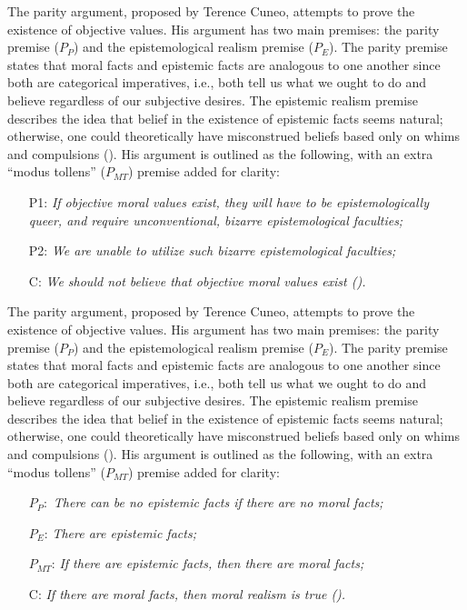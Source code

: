 The parity argument, proposed by Terence Cuneo, attempts to prove the existence of objective values. His argument has two main premises: the parity premise ($P_P$) and the epistemological realism premise ($P_E$). The parity premise states that moral facts and epistemic facts are analogous to one another since both are categorical imperatives, i.e., both tell us what we ought to do and believe regardless of our subjective desires. The epistemic realism premise describes the idea that belief in the existence of epistemic facts seems natural; otherwise, one could theoretically have misconstrued beliefs based only on whims and compulsions (\cite[pp.\ 52–62]{cuneo2010normative}). His argument is outlined as the following, with an extra “modus tollens” ($P_{MT}$) premise added for clarity:
\begin{enumerate}

	\item[P1:] \textit{If objective moral values exist, they will have to be epistemologically queer, and require unconventional, bizarre epistemological faculties;}

	\item[P2:] \textit{We are unable to utilize such bizarre epistemological faculties;}

	\item[C:] \textit{We should not believe that objective moral values exist (\cites[pp.\ 38–41]{mackie1978ethics}[pp.\ 1–2]{lillehammer2019queerness}).}

\end{enumerate}

The parity argument, proposed by Terence Cuneo, attempts to prove the existence of objective values. His argument has two main premises: the parity premise ($P_P$) and the epistemological realism premise ($P_E$). The parity premise states that moral facts and epistemic facts are analogous to one another since both are categorical imperatives, i.e., both tell us what we ought to do and believe regardless of our subjective desires. The epistemic realism premise describes the idea that belief in the existence of epistemic facts seems natural; otherwise, one could theoretically have misconstrued beliefs based only on whims and compulsions (\cite[pp.\ 52–62]{cuneo2010normative}). His argument is outlined as the following, with an extra “modus tollens” ($P_{MT}$) premise added for clarity: 
\begin{enumerate}

\item[$P_P:$] \textit{There can be no epistemic facts if there are no moral facts;}

\item[$P_E$:] \textit{There are epistemic facts;}

\item[$P_{MT}$:] \textit{If there are epistemic facts, then there are moral facts;}

\item[C:] \textit{If there are moral facts, then moral realism is true (\cite[p.\ 1]{rutten2010parity}).}

\end{enumerate}

